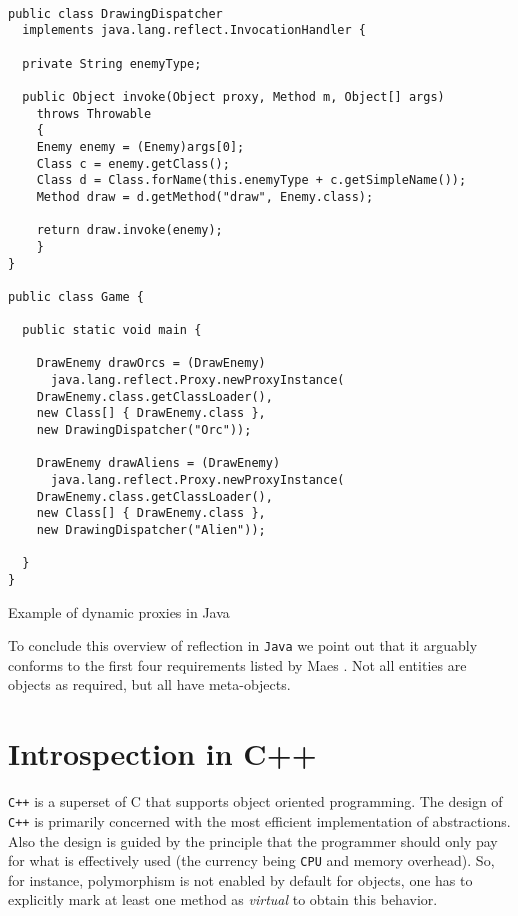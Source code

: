 \begin{listing}[H]
\begin{verbatim}

public class DrawingDispatcher 
  implements java.lang.reflect.InvocationHandler {
  
  private String enemyType;
  
  public Object invoke(Object proxy, Method m, Object[] args)
	throws Throwable
    {
	Enemy enemy = (Enemy)args[0];
	Class c = enemy.getClass();    
	Class d = Class.forName(this.enemyType + c.getSimpleName());    
	Method draw = d.getMethod("draw", Enemy.class);
	
	return draw.invoke(enemy);
    }
}

public class Game {

  public static void main {
  
    DrawEnemy drawOrcs = (DrawEnemy)
      java.lang.reflect.Proxy.newProxyInstance(
	DrawEnemy.class.getClassLoader(),
	new Class[] { DrawEnemy.class },
	new DrawingDispatcher("Orc"));
					
    DrawEnemy drawAliens = (DrawEnemy)
      java.lang.reflect.Proxy.newProxyInstance(
	DrawEnemy.class.getClassLoader(),
	new Class[] { DrawEnemy.class },
	new DrawingDispatcher("Alien"));
    
  }
}
\end{verbatim}
\caption{Example of dynamic proxies in Java}
\label{lst:game3}
\end{listing}

To conclude this overview of reflection in \texttt{Java} we point out that it arguably conforms to the first four requirements listed by
Maes \cite{Maes}. Not all entities are objects as required, but all have meta-objects.

\section{Introspection in C++}

\texttt{C++} is a superset of C that supports object oriented programming. The design of \texttt{C++} is primarily concerned with the most efficient
implementation of abstractions. Also the design is guided by the principle that the programmer should only pay for what
is effectively used (the currency being \texttt{CPU} and memory overhead). So, for instance, polymorphism is not enabled by default
for objects, one has to explicitly mark at least one method as \emph{virtual} to obtain this behavior.

